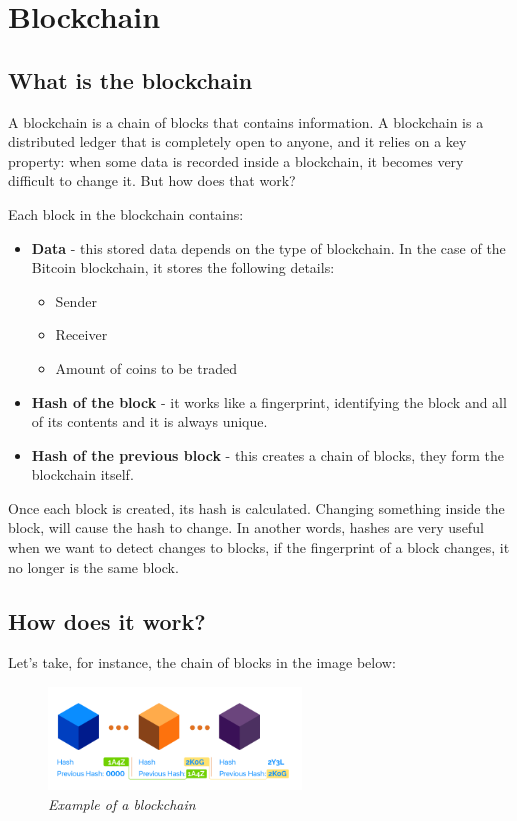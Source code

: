 \documentclass{article}
\newcommand\tab[1][1cm]{\hspace*{#1}}
\begin{document}
\section{Blockchain}

\subsection{What is the blockchain}

\tab A blockchain is a chain of blocks that contains information. A blockchain is a distributed ledger that is completely open to anyone, and it relies on a key property: when some data is recorded inside a blockchain, it becomes very difficult to change it. But how does that work?

Each block in the blockchain contains:

\begin{itemize}
    \item \textbf{Data} - this stored data depends on the type of blockchain. In the case of the Bitcoin blockchain, it stores the following details:
    \begin{itemize}
        \item Sender
        \item Receiver
        \item Amount of coins to be traded
    \end{itemize}
    \item \textbf{Hash of the block} - it works like a fingerprint, identifying the block and all of its contents and it is always unique.
    \item \textbf{Hash of the previous block} - this creates a chain of blocks, they form the blockchain itself.
\end{itemize}

Once each block is created, its hash is calculated. Changing something inside the block, will cause the hash to change. In another words, hashes are very useful when we want to detect changes to blocks, if the fingerprint of a block changes, it no longer is the same block.

\subsection{How does it work?}

\tab Let's take, for instance, the chain of blocks in the image below:

\begin{figure}[H]
    \begin{center}
        \includegraphics[width=0.6\textwidth]{images/changes_in_block.png}
        \caption{\textit{Example of a blockchain}}
    \end{center}
\end{figure}
\end{document}
